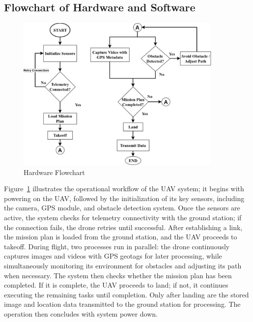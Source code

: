 \subsection{Flowchart of Hardware and Software}

\begin{figure}[H]
	\centering
	\caption{Hardware Flowchart}
	\label{fig:HardFlow}
	\includegraphics[width=0.9\textwidth]{figures/hardware_flowchart.pdf}
\end{figure}
Figure~\ref{fig:HardFlow} illustrates the operational workflow of the UAV system; it begins with powering on the UAV, followed by the initialization of its key sensors, including the camera, GPS module, and obstacle detection system. Once the sensors are active, the system checks for telemetry connectivity with the ground station; if the connection fails, the drone retries until successful. After establishing a link, the mission plan is loaded from the ground station, and the UAV proceeds to takeoff. During flight, two processes run in parallel: the drone continuously captures images and videos with GPS geotags for later processing, while simultaneously monitoring its environment for obstacles and adjusting its path when necessary. The system then checks whether the mission plan has been completed. If it is complete, the UAV proceeds to land; if not, it continues executing the remaining tasks until completion. Only after landing are the stored image and location data transmitted to the ground station for processing. The operation then concludes with system power down.

